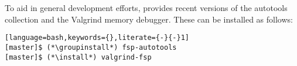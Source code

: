 To aid in general development efforts, \OHPC{} provides recent versions of the \GNU{}
autotools collection and the Valgrind memory debugger. These can be installed as follows:

\begin{lstlisting}[language=bash,keywords={},literate={-}{-}1]
[master]$ (*\groupinstall*) fsp-autotools
[master]$ (*\install*) valgrind-fsp
\end{lstlisting}
